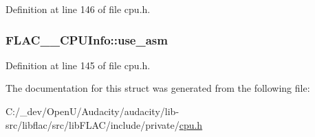Definition at line 146 of file cpu.\+h.

\subsubsection[{\texorpdfstring{use\+\_\+asm}{use_asm}}]{ F\+L\+A\+C\+\_\+\+\_\+\+C\+P\+U\+Info\+::use\+\_\+asm}\hypertarget{struct_f_l_a_c_____c_p_u_info_aaddf58435509c1c35643b6a8120fde5f}{}\label{struct_f_l_a_c_____c_p_u_info_aaddf58435509c1c35643b6a8120fde5f}


Definition at line 145 of file cpu.\+h.



The documentation for this struct was generated from the following file\+:\begin{DoxyCompactItemize}
\item 
C\+:/\+\_\+dev/\+Open\+U/\+Audacity/audacity/lib-\/src/libflac/src/lib\+F\+L\+A\+C/include/private/\hyperlink{libflac_2src_2lib_f_l_a_c_2include_2private_2cpu_8h}{cpu.\+h}\end{DoxyCompactItemize}
